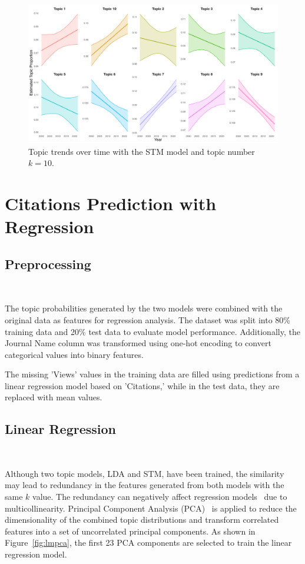 \documentclass[9pt,twocolumn,twoside]{pnas-new}
\begin{document}
\begin{figure}[!tbhp]
\centering
\includegraphics[width=0.9\linewidth]{bag_words/STM_trendtime.png}
\caption{Topic trends over time with the STM model and topic number $k = 10$.}
\label{fig:STMtrend}
\end{figure}

\section*{Citations Prediction with Regression}

\subsection*{Preprocessing} \

The topic probabilities generated by the two models were combined with the original data as features for regression analysis. The dataset was split into 80\% training data and 20\% test data to evaluate model performance. Additionally, the Journal Name column was transformed using one-hot encoding to convert categorical values into binary features.

The missing 'Views' values in the training data are filled using predictions from a linear regression model based on 'Citations,' while in the test data, they are replaced with mean values.

\subsection*{Linear Regression} \

Although two topic models, LDA and STM, have been trained, the similarity may lead to redundancy in the features generated from both models with the same $k$ value. The redundancy can negatively affect regression models~\cite{lm} due to multicollinearity. Principal Component Analysis (PCA)~\cite{doi:10.1080/14786440109462720} is applied to reduce the dimensionality of the combined topic distributions and transform correlated features into a set of uncorrelated principal components. As shown in Figure~\ref{fig:lmpca}, the first 23 PCA components are selected to train the linear regression model.
\end{document}
